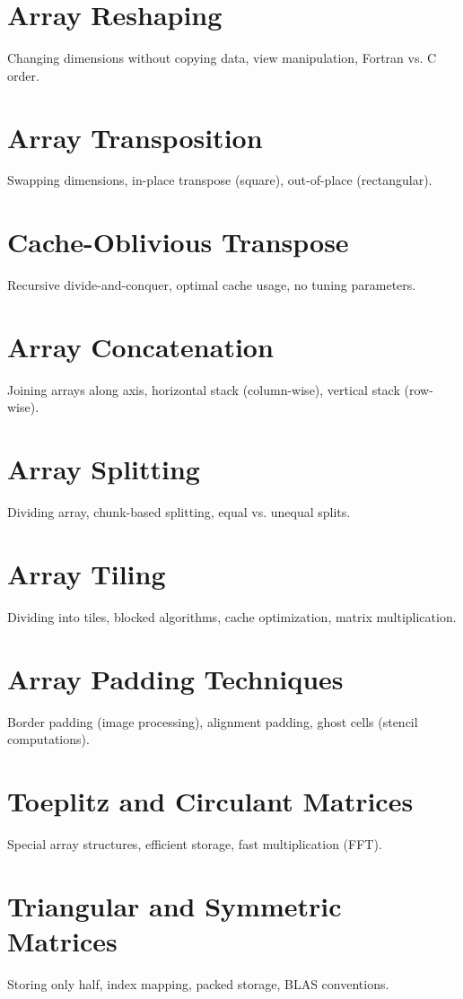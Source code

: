 \chapter{Array Reshaping}
Changing dimensions without copying data, view manipulation, Fortran vs. C order.

\chapter{Array Transposition}
Swapping dimensions, in-place transpose (square), out-of-place (rectangular).

\chapter{Cache-Oblivious Transpose}
Recursive divide-and-conquer, optimal cache usage, no tuning parameters.

\chapter{Array Concatenation}
Joining arrays along axis, horizontal stack (column-wise), vertical stack (row-wise).

\chapter{Array Splitting}
Dividing array, chunk-based splitting, equal vs. unequal splits.

\chapter{Array Tiling}
Dividing into tiles, blocked algorithms, cache optimization, matrix multiplication.

\chapter{Array Padding Techniques}
Border padding (image processing), alignment padding, ghost cells (stencil computations).

\chapter{Toeplitz and Circulant Matrices}
Special array structures, efficient storage, fast multiplication (FFT).

\chapter{Triangular and Symmetric Matrices}
Storing only half, index mapping, packed storage, BLAS conventions.

